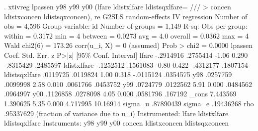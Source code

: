 . xtivreg lpassen y98 y99 y00 (lfare ldistxlfare ldistsqxlfare= ///
> concen ldistxconcen ldistsqxconcen), re
{\smallskip}
G2SLS random-effects IV regression              Number of obs     =      4,596
Group variable: id                              Number of groups  =      1,149
{\smallskip}
R-sq:                                           Obs per group:
     within  = 0.3172                                         min =          4
     between = 0.0273                                         avg =        4.0
     overall = 0.0362                                         max =          4
{\smallskip}
                                                Wald chi2(6)      =     173.26
corr(u_i, X)       = 0 (assumed)                Prob > chi2       =     0.0000
{\smallskip}
      lpassen {\VBAR}      Coef.   Std. Err.      z    P>|z|     [95\% Conf. Interval]
        lfare {\VBAR}  -.2914916   .2755414    -1.06   0.290    -.8315429    .2485597
  ldistxlfare {\VBAR}  -.1252512   .1561083    -0.80   0.422    -.4312177    .1807154
ldistsqxlfare {\VBAR}   .0119725   .0119824     1.00   0.318    -.0115124    .0354575
          y98 {\VBAR}   .0257759   .0099998     2.58   0.010     .0061766    .0453752
          y99 {\VBAR}   .0724779   .0122562     5.91   0.000     .0484562    .0964997
          y00 {\VBAR}   .1126858   .0278098     4.05   0.000     .0581796     .167192
        _cons {\VBAR}   7.443569   1.390625     5.35   0.000     4.717995    10.16914
      sigma_u {\VBAR}  .87890439
      sigma_e {\VBAR}  .19436268
          rho {\VBAR}  .95337629   (fraction of variance due to u_i)
Instrumented:   lfare ldistxlfare ldistsqxlfare
Instruments:    y98 y99 y00 concen ldistxconcen ldistsqxconcen
{\smallskip}
